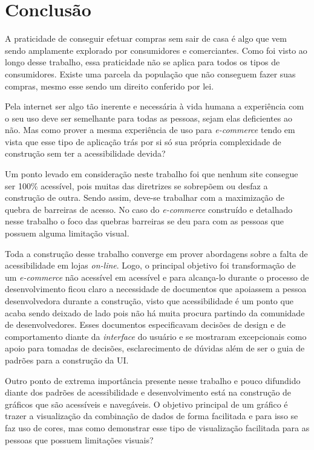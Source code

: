 \section{Conclusão}
\label{sec:conclusao}


{

A praticidade de conseguir efetuar compras sem sair de casa é algo que vem sendo amplamente explorado por consumidores e comerciantes. Como foi visto ao longo desse trabalho, essa praticidade não se aplica para todos os tipos de consumidores. Existe uma parcela da população que não conseguem fazer suas compras, mesmo esse sendo um direito conferido por lei.

Pela internet ser algo tão inerente e necessária à vida humana a experiência com o seu uso deve ser semelhante para todas as pessoas, sejam elas deficientes ao não. Mas como prover a mesma experiência de uso para \textit{e-commerce} tendo em vista que esse tipo de aplicação trás por si só sua própria complexidade de construção sem ter a acessibilidade devida? 

Um ponto levado em consideração neste trabalho foi que nenhum site consegue ser 100\% acessível, pois muitas das diretrizes se sobrepõem ou desfaz a construção de outra. Sendo assim, deve-se trabalhar com a maximização de quebra de barreiras de acesso. No caso do \textit{e-commerce} construído e detalhado nesse trabalho o foco das quebras barreiras se deu para com as pessoas que possuem alguma limitação visual. 

Toda a construção desse trabalho converge em prover abordagens sobre a falta de acessibilidade em lojas \textit{on-line}. Logo, o principal objetivo foi transformação de um \textit{e-commerce} não acessível em acessível e para alcança-lo durante o processo de desenvolvimento ficou claro a necessidade de documentos que apoiassem a pessoa desenvolvedora durante a construção, visto que acessibilidade é um ponto que acaba sendo deixado de lado pois não há muita procura partindo da comunidade de desenvolvedores. Esses documentos especificavam decisões de design e de comportamento diante da \textit{interface} do usuário e se mostraram excepcionais como apoio para tomadas de decisões, esclarecimento de dúvidas além de ser o guia de padrões para a construção da UI.

Outro ponto de extrema importância presente nesse trabalho e pouco difundido diante dos padrões de acessibilidade e desenvolvimento está na construção de gráficos que são acessíveis e navegáveis. O objetivo principal de um gráfico é trazer a visualização da combinação de dados de forma facilitada e para isso se faz uso de cores, mas como demonstrar esse tipo de visualização facilitada para as pessoas que possuem limitações visuais? 

}
